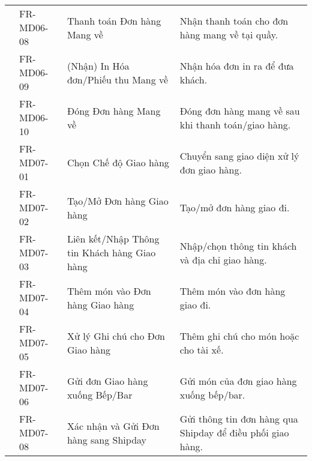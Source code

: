 \begin{longtable}{|m{2.5cm}|m{2.5cm}|m{5cm}|m{5cm}|}
	                                                        & FR-MD06-08            & Thanh toán Đơn hàng Mang về                            & Nhận thanh toán cho đơn hàng mang về tại quầy.                                              \\
	                                                        & FR-MD06-09            & (Nhận) In Hóa đơn/Phiếu thu Mang về                    & Nhận hóa đơn in ra để đưa khách.                                                            \\
	                                                        & FR-MD06-10            & Đóng Đơn hàng Mang về                                  & Đóng đơn hàng mang về sau khi thanh toán/giao hàng.                                         \\ \cline{2-4}
	                                                        & FR-MD07-01            & Chọn Chế độ Giao hàng                                  & Chuyển sang giao diện xử lý đơn giao hàng.                                                  \\
	                                                        & FR-MD07-02            & Tạo/Mở Đơn hàng Giao hàng                              & Tạo/mở đơn hàng giao đi.                                                                    \\
	                                                        & FR-MD07-03            & Liên kết/Nhập Thông tin Khách hàng Giao hàng           & Nhập/chọn thông tin khách và địa chỉ giao hàng.                                             \\
	                                                        & FR-MD07-04            & Thêm món vào Đơn hàng Giao hàng                        & Thêm món vào đơn hàng giao đi.                                                              \\
	                                                        & FR-MD07-05            & Xử lý Ghi chú cho Đơn Giao hàng                        & Thêm ghi chú cho món hoặc cho tài xế.                                                       \\
	                                                        & FR-MD07-06            & Gửi đơn Giao hàng xuống Bếp/Bar                        & Gửi món của đơn giao hàng xuống bếp/bar.                                                    \\
	                                                        & FR-MD07-08            & Xác nhận và Gửi Đơn hàng sang Shipday                  & Gửi thông tin đơn hàng qua Shipday để điều phối giao hàng.                                  \\

\end{longtable}
